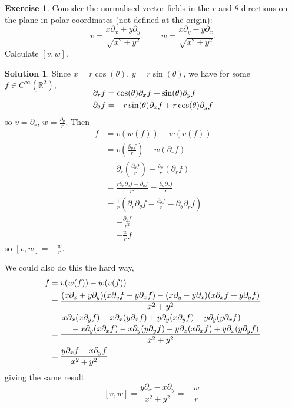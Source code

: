 \documentclass[11pt, a4paper]{article}
\theoremstyle{definition}
\newtheorem{ex}{Exercise}[part]
\newtheorem{sol}{Solution}[part]
\begin{document}
\begin{ex}

Consider the normalised vector fields in the $r$ and $\theta$ directions on the plane in polar coordinates (not defined at the origin):
\[
    v = \frac{x \partial_x + y \partial_y}{\sqrt{x^2 + y^2}}, \qquad
    w = \frac{x \partial_y - y \partial_x}{\sqrt{x^2 + y^2}}.
\]
Calculate $[v, w]$.

\end{ex}

\begin{sol}

Since $x = r \cos(\theta)$, $y = r \sin(\theta)$, we have for some $f \in C^\infty(\mathbb{R}^2)$,
\begin{align*}
    \SwapAboveDisplaySkip
    \partial_r f &=\cos(\theta) \partial_x f + \sin(\theta) \partial_y f \\
    \partial_\theta f &= -r \sin(\theta) \partial_x f + r \cos(\theta) \partial_y f
\end{align*}
so $v = \partial_r$, $w = \frac{\partial_\theta}{r}$.
Then
\begin{align*}
    [v, w]f &= v(w(f)) - w(v(f)) \\
        &= v\left(\frac{\partial_\theta f}{r}\right) - w(\partial_r f) \\
        &= \partial_r\left(\frac{\partial_\theta f}{r}\right)
            - \frac{\partial_\theta}{r}(\partial_r f) \\
        &= \frac{r \partial_r \partial_\theta f - \partial_\theta f}{r^2}
            - \frac{\partial_\theta \partial_r f}{r} \\
        &= \frac{1}{r} \left(\partial_r \partial_\theta f - \frac{\partial_\theta f}{r}
            - \partial_\theta \partial_r f\right) \\
        &= -\frac{\partial_\theta f}{r^2} \\
        &= -\frac{w}{r} f
\end{align*}
so $[v, w] = -\frac{w}{r}$.

We could also do this the hard way,
\begin{align*}
    [v, w]f &= v(w(f)) - w(v(f)) \\
        &= \frac{(x \partial_x + y \partial_y)(x \partial_y f - y \partial_x f) - (x \partial_y - y \partial_x)(x \partial_x f + y \partial_y f)}{x^2 + y^2} \\
        &= \frac{\splitdfrac{x \partial_x (x\partial_y f)
                             - x\partial_x(y \partial_x f)
                             + y \partial_y(x\partial_y f)
                             - y \partial_y(y \partial_x f)}
                            {{}-x\partial_y(x\partial_x f)
                             - x\partial_y(y\partial_y f)
                             + y\partial_x(x \partial_x f)
                             + y\partial_x (y \partial_y f)}
                }{x^2 + y^2} \\
        &= \frac{y \partial_x f - x \partial_y f}{x^2 + y^2}
\end{align*}
giving the same result
\[
    [v, w] = \frac{y \partial_x - x \partial_y}{x^2 + y^2} = -\frac{w}{r}.
\]

\end{sol}
\end{document}
